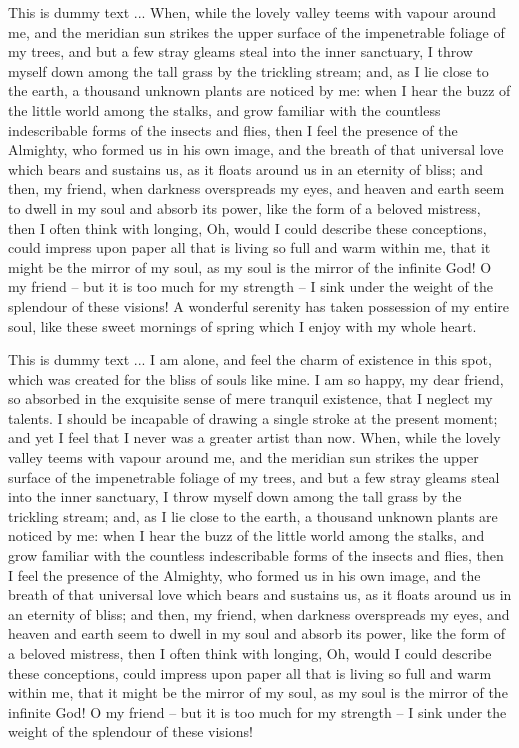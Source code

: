 \documentclass[letterpaper,oneside,12pt]{book}
\begin{document}
This is dummy text ... When, while the lovely valley teems with vapour around me, and the meridian sun strikes the upper surface of the impenetrable foliage of my trees, and but a few stray gleams steal into the inner sanctuary, I throw myself down among the tall grass by the trickling stream; and, as I lie close to the earth, a thousand unknown plants are noticed by me: when I hear the buzz of the little world among the stalks, and grow familiar with the countless indescribable forms of the insects and flies, then I feel the presence of the Almighty, who formed us in his own image, and the breath of that universal love which bears and sustains us, as it floats around us in an eternity of bliss; and then, my friend, when darkness overspreads my eyes, and heaven and earth seem to dwell in my soul and absorb its power, like the form of a beloved mistress, then I often think with longing, Oh, would I could describe these conceptions, could impress upon paper all that is living so full and warm within me, that it might be the mirror of my soul, as my soul is the mirror of the infinite God! O my friend -- but it is too much for my strength -- I sink under the weight of the splendour of these visions! A wonderful serenity has taken possession of my entire soul, like these sweet mornings of spring which I enjoy with my whole heart.



This is dummy text ... I am alone, and feel the charm of existence in this spot, which was created for the bliss of souls like mine. I am so happy, my dear friend, so absorbed in the exquisite sense of mere tranquil existence, that I neglect my talents. I should be incapable of drawing a single stroke at the present moment; and yet I feel that I never was a greater artist than now. When, while the lovely valley teems with vapour around me, and the meridian sun strikes the upper surface of the impenetrable foliage of my trees, and but a few stray gleams steal into the inner sanctuary, I throw myself down among the tall grass by the trickling stream; and, as I lie close to the earth, a thousand unknown plants are noticed by me: when I hear the buzz of the little world among the stalks, and grow familiar with the countless indescribable forms of the insects and flies, then I feel the presence of the Almighty, who formed us in his own image, and the breath of that universal love which bears and sustains us, as it floats around us in an eternity of bliss; and then, my friend, when darkness overspreads my eyes, and heaven and earth seem to dwell in my soul and absorb its power, like the form of a beloved mistress, then I often think with longing, Oh, would I could describe these conceptions, could impress upon paper all that is living so full and warm within me, that it might be the mirror of my soul, as my soul is the mirror of the infinite God! O my friend -- but it is too much for my strength -- I sink under the weight of the splendour of these visions!
\end{document}
